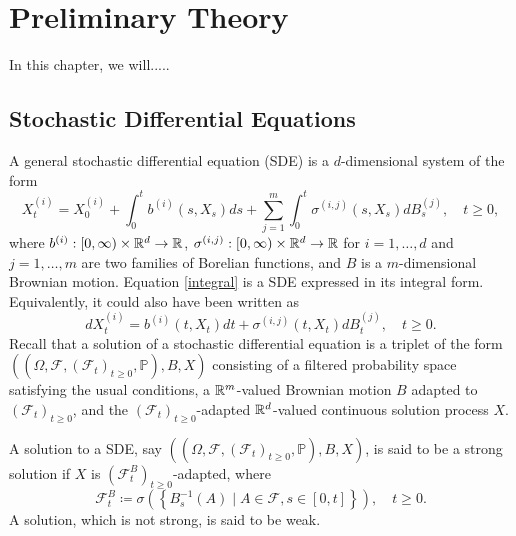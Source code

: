 \chapter{Preliminary Theory}
In this chapter, we will.....

\section{Stochastic Differential Equations}\label{section:SDE}
A general stochastic differential equation (SDE) is a $d$-dimensional system of the form
\begin{equation}\label{integral}
    X_{t}^{(i)}=X_{0}^{(i)}+ \int_{0}^{t}b^{(i)}(s,X_{s})ds+\sum_{j=1}^{m}\int_{0}^{t}\sigma^{(i,j)}(s,X_{s})dB_{s}^{(j)},\quad t\geq 0,
\end{equation}
where $b^{(i)}:[0,\infty)\times \mathbb{R}^{d}\to \mathbb{R}$, $\sigma^{(i,j)}:[0,\infty)\times\mathbb{R}^{d}\to\mathbb{R}$ for $i=1,\dots,d$ and $j=1,\dots,m$ are two families of Borelian functions, and $B$ is a $m$-dimensional Brownian motion. Equation \eqref{integral} is a SDE expressed in its integral form. Equivalently, it could also have been written as
\begin{equation}
    dX_{t}^{(i)}= b^{(i)}(t,X_{t})dt +\sigma^{(i,j)}(t,X_{t})dB_{t}^{(j)}, \quad t\geq 0.
\end{equation}
Recall that a solution of a stochastic differential equation is a triplet of the form \newline$\left((\Omega,\mathcal{F},(\mathcal{F}_{t})_{t\geq 0},\mathbb{P}),B,X\right)$ consisting of a filtered probability space satisfying the usual conditions, a $\mathbb{R}^{m}$-valued Brownian motion $B$ adapted to $(\mathcal{F}_{t})_{t\geq 0}$, and the $(\mathcal{F}_{t})_{t\geq 0}$-adapted $\mathbb{R}^{d}$-valued continuous solution process $X$.

A solution to a SDE, say $\left((\Omega,\mathcal{F},(\mathcal{F}_{t})_{t\geq 0},\mathbb{P}),B,X\right)$, is said to be a strong solution if $X$ is $(\mathcal{F}_{t}^{B})_{t\geq 0}$-adapted, where 
\begin{equation}
    \mathcal{F}_{t}^{B}\coloneqq \sigma\left(\left\{B_{s}^{-1}(A)\mid A\in\mathcal{F}, s\in [0,t] \right\}\right),\quad t\geq 0.
\end{equation}
A solution, which is not strong, is said to be weak. 

